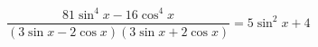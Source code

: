 \begin{ex}[type=prove_identity]
	\begin{condition}
		\( \dfrac{81\sin^4x-16\cos^4x}{(3\sin x-2\cos x)(3\sin x+2\cos x)}=5\sin^2x+4 \)
	\end{condition}
\end{ex}